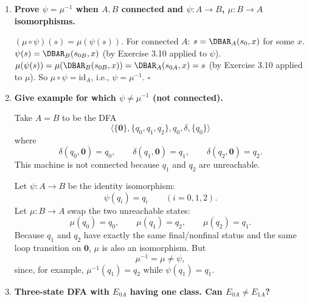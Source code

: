 \begin{enumerate}[{3.}1.]
\begin{enumerate}
\item Well-defined: $[x]_{R^A}=[y]_{R^A}\Rightarrow\DBAR(s_0,x)=\DBAR(s_0,y)$. \checkmark

\item Homomorphism: $\psi([\lambda]_{R^A})=s_0$. Also
\[
\psi([xa]_{R^A})=\DBAR(s_0,xa)=\delta(\DBAR(s_0,x),a)
=\delta(\psi([x]_{R^A}),a).
\]
Finally, since $F^c=F\cap S^c$ for the connected part of $A$,
\[
[x]\in F_{R^A}\Leftrightarrow x\in L(A)
\Leftrightarrow\DBAR(s_0,x)\in F
\Leftrightarrow\psi([x])\in F^c.
\]
\checkmark

\item Isomorphism: Injective: $\psi([x])=\psi([y])\Rightarrow\DBAR(s_0,x)=\DBAR(s_0,y)\Rightarrow[x]=[y]$. Surjective (onto $S^c$): if $s\in S^c$, then connectedness gives a string $x_s$ with $s=\DBAR(s_0,x_s)$, and therefore $s=\psi([x_s])$.
\end{enumerate}

\item \textbf{Prove $\psi=\mu^{-1}$ when $A,B$ connected and $\psi: A\to B$, $\mu: B\to A$ isomorphisms.}

$(\mu\circ\psi)(s)=\mu(\psi(s))$. For connected $A$: $s=\DBAR_A(s_0,x)$ for some $x$. $\psi(s)=\DBAR_B(s_{0B},x)$ (by Exercise 3.10 applied to $\psi$). $\mu(\psi(s))=\mu(\DBAR_B(s_{0B},x))=\DBAR_A(s_{0A},x)=s$ (by Exercise 3.10 applied to $\mu$). So $\mu\circ\psi=\mathrm{id}_A$, i.e., $\psi=\mu^{-1}$. $\square$

\item \textbf{Give example for which $\psi\neq\mu^{-1}$ (not connected).}

Take $A=B$ to be the DFA
\[
\langle\{\pmb{0}\},\{q_0,q_1,q_2\},q_0,\delta,\{q_0\}\rangle
\]
where
\[
\delta(q_0,\pmb{0})=q_0,\qquad \delta(q_1,\pmb{0})=q_1,\qquad
\delta(q_2,\pmb{0})=q_2.
\]
This machine is not connected because $q_1$ and $q_2$ are unreachable.

Let $\psi:A\to B$ be the identity isomorphism:
\[
\psi(q_i)=q_i \qquad (i=0,1,2).
\]
Let $\mu:B\to A$ swap the two unreachable states:
\[
\mu(q_0)=q_0,\qquad \mu(q_1)=q_2,\qquad \mu(q_2)=q_1.
\]
Because $q_1$ and $q_2$ have exactly the same final/nonfinal status and the same
loop transition on $\pmb{0}$, $\mu$ is also an isomorphism. But
\[
\mu^{-1}=\mu\neq\psi,
\]
since, for example, $\mu^{-1}(q_1)=q_2$ while $\psi(q_1)=q_1$.

\item \textbf{Three-state DFA with $E_{0A}$ having one class. Can $E_{0A}\neq E_{1A}$?}


\end{enumerate}
